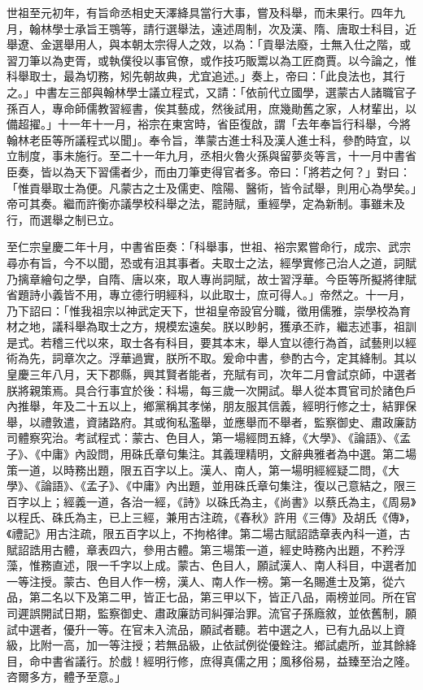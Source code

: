 \begin{pinyinscope}
 世祖至元初年，有旨命丞相史天澤絳具當行大事，嘗及科舉，而未果行。四年九月，翰林學士承旨王鶚等，請行選舉法，遠述周制，次及漢、隋、唐取士科目，近舉遼、金選舉用人，與本朝太宗得人之效，以為：「貢舉法廢，士無入仕之階，或習刀筆以為吏胥，或執僕役以事官僚，或作技巧販鬻以為工匠商賈。以今論之，惟科舉取士，最為切務，矧先朝故典，尤宜追述。」奏上，帝曰：「此良法也，其行之。」中書左三部與翰林學士議立程式，又請：「依前代立國學，選蒙古人諸職官子孫百人，專命師儒教習經書，俟其藝成，然後試用，庶幾勛舊之家，人材輩出，以備超擢。」十一年十一月，裕宗在東宮時，省臣復啟，謂「去年奉旨行科舉，今將翰林老臣等所議程式以聞」。奉令旨，準蒙古進士科及漢人進士科，參酌時宜，以立制度，事未施行。至二十一年九月，丞相火魯火孫與留夢炎等言，十一月中書省臣奏，皆以為天下習儒者少，而由刀筆吏得官者多。帝曰：「將若之何？」對曰：「惟貢舉取士為便。凡蒙古之士及儒吏、陰陽、醫術，皆令試舉，則用心為學矣。」帝可其奏。繼而許衡亦議學校科舉之法，罷詩賦，重經學，定為新制。事雖未及行，而選舉之制已立。



 至仁宗皇慶二年十月，中書省臣奏：「科舉事，世祖、裕宗累嘗命行，成宗、武宗尋亦有旨，今不以聞，恐或有沮其事者。夫取士之法，經學實修己治人之道，詞賦乃摛章繪句之學，自隋、唐以來，取人專尚詞賦，故士習浮華。今臣等所擬將律賦省題詩小義皆不用，專立德行明經科，以此取士，庶可得人。」帝然之。十一月，乃下詔曰：「惟我祖宗以神武定天下，世祖皇帝設官分職，徵用儒雅，崇學校為育材之地，議科舉為取士之方，規模宏遠矣。朕以眇躬，獲承丕祚，繼志述事，祖訓是式。若稽三代以來，取士各有科目，要其本末，舉人宜以德行為首，試藝則以經術為先，詞章次之。浮華過實，朕所不取。爰命中書，參酌古今，定其絳制。其以皇慶三年八月，天下郡縣，興其賢者能者，充賦有司，次年二月會試京師，中選者朕將親策焉。具合行事宜於後：科場，每三歲一次開試。舉人從本貫官司於諸色戶內推舉，年及二十五以上，鄉黨稱其孝悌，朋友服其信義，經明行修之士，結罪保舉，以禮敦遣，資諸路府。其或徇私濫舉，並應舉而不舉者，監察御史、肅政廉訪司體察究治。考試程式：蒙古、色目人，第一場經問五絳，《大學》、《論語》、《孟子》、《中庸》內設問，用硃氏章句集注。其義理精明，文辭典雅者為中選。第二場策一道，以時務出題，限五百字以上。漢人、南人，第一場明經經疑二問，《大學》、《論語》、《孟子》、《中庸》內出題，並用硃氏章句集注，復以己意結之，限三百字以上；經義一道，各治一經，《詩》以硃氏為主，《尚書》以蔡氏為主，《周易》以程氏、硃氏為主，已上三經，兼用古注疏，《春秋》許用《三傳》及胡氏《傳》，《禮記》用古注疏，限五百字以上，不拘格律。第二場古賦詔誥章表內科一道，古賦詔誥用古體，章表四六，參用古體。第三場策一道，經史時務內出題，不矜浮藻，惟務直述，限一千字以上成。蒙古、色目人，願試漢人、南人科目，中選者加一等注授。蒙古、色目人作一榜，漢人、南人作一榜。第一名賜進士及第，從六品，第二名以下及第二甲，皆正七品，第三甲以下，皆正八品，兩榜並同。所在官司遲誤開試日期，監察御史、肅政廉訪司糾彈治罪。流官子孫廕敘，並依舊制，願試中選者，優升一等。在官未入流品，願試者聽。若中選之人，已有九品以上資級，比附一高，加一等注授；若無品級，止依試例從優銓注。鄉試處所，並其餘絳目，命中書省議行。於戲！經明行修，庶得真儒之用；風移俗易，益臻至治之隆。咨爾多方，體予至意。」




\end{pinyinscope}
